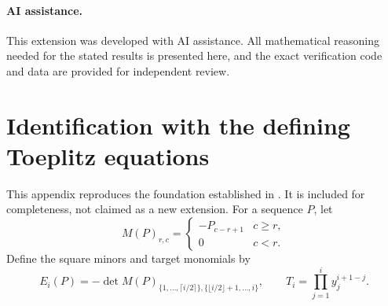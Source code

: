 \documentclass[11pt]{article}
\theoremstyle{definition}
\theoremstyle{remark}
\begin{document}
\paragraph{AI assistance.}
This extension was developed with AI assistance. All mathematical reasoning
needed for the stated results is presented here, and the exact verification
code and data are provided for independent review.

\appendix
\section{Identification with the defining Toeplitz equations}\label{app:identification}
This appendix reproduces the foundation established in \cite{Polynomiality}.
It is included for completeness, not claimed as a new extension.
For a sequence $P$, let
\[
 M(P)_{r,c}=\begin{cases}-P_{c-r+1}&c\ge r,\\0&c<r.\end{cases}
\]
Define the square minors and target monomials by
\[
 E_i(P)=-\det M(P)_{\{1,\ldots,\lceil i/2\rceil\},
                       \{\lfloor i/2\rfloor+1,\ldots,i\}},\qquad
 T_i=\prod_{j=1}^i y_j^{i+1-j}.
\]
\end{document}
